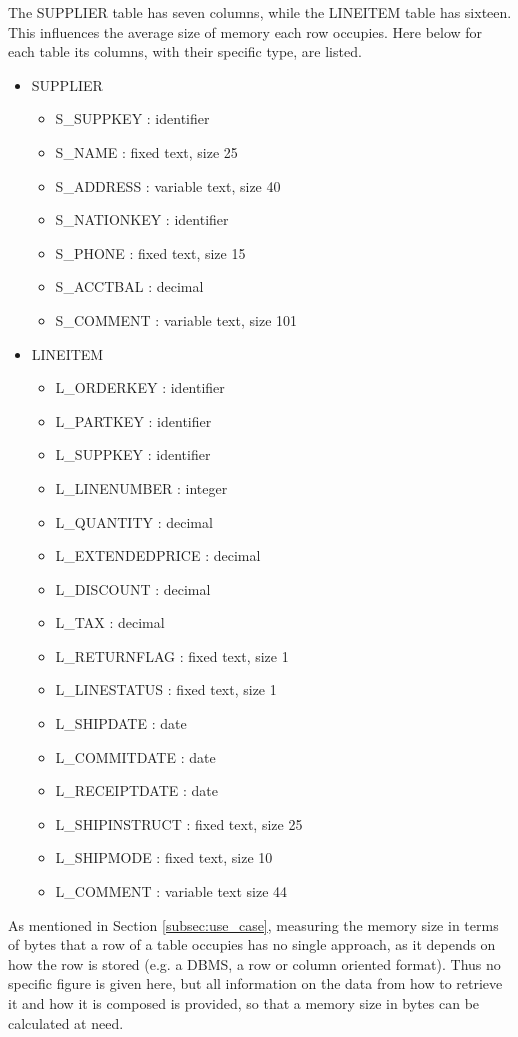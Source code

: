 The SUPPLIER table has seven columns, while the LINEITEM table has sixteen. This influences the average size of memory each row occupies. Here below for each table its columns, with their specific type, are listed.
\begin{itemize}
  \item SUPPLIER
  \begin{itemize}
    \item S\_SUPPKEY : identifier
    \item S\_NAME : fixed text, size 25
    \item S\_ADDRESS : variable text, size 40
    \item S\_NATIONKEY : identifier
    \item S\_PHONE : fixed text, size 15
    \item S\_ACCTBAL : decimal
    \item S\_COMMENT : variable text, size 101
  \end{itemize}
  \item LINEITEM
  \begin{itemize}
    \item L\_ORDERKEY : identifier
    \item L\_PARTKEY : identifier
    \item L\_SUPPKEY : identifier
    \item L\_LINENUMBER : integer
    \item L\_QUANTITY : decimal
    \item L\_EXTENDEDPRICE : decimal
    \item L\_DISCOUNT : decimal
    \item L\_TAX : decimal
    \item L\_RETURNFLAG : fixed text, size 1
    \item L\_LINESTATUS : fixed text, size 1
    \item L\_SHIPDATE : date
    \item L\_COMMITDATE : date
    \item L\_RECEIPTDATE : date
    \item L\_SHIPINSTRUCT : fixed text, size 25
    \item L\_SHIPMODE : fixed text, size 10
    \item L\_COMMENT : variable text size 44
  \end{itemize} 
\end{itemize}
As mentioned in Section \ref{subsec:use_case}, measuring the memory size in terms of bytes that a row of a table occupies has no single approach, as it depends on how the row is stored (e.g. a \gls{DBMS}, a row or column oriented format). Thus no specific figure is given here, but all information on the data from how to retrieve it and how it is composed is provided, so that a memory size in bytes can be calculated at need.

